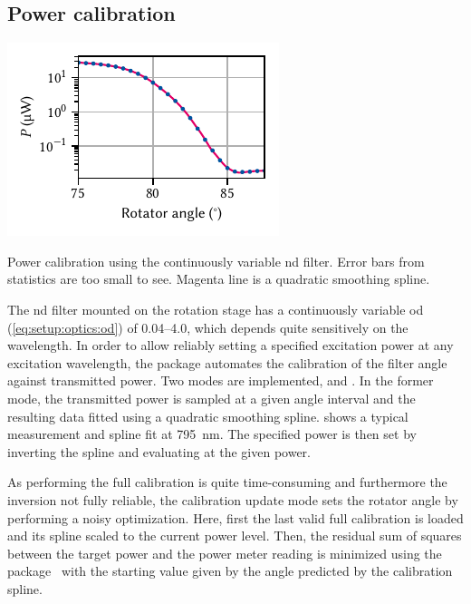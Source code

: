 \subsection{Power calibration}\label{subsec:sec:exp:mjolnir:calibration:power}
\begin{marginfigure}
    \centering
    \includegraphics{img/pdf/experiment/power_calibration}
    \caption[]{
        Power calibration using the continuously variable \acrshort{nd} filter.
        Error bars from statistics are too small to see.
        Magenta line is a quadratic smoothing spline.
    }
    \label{fig:exp:mjolnir:power_calibration}
\end{marginfigure}

The \gls{nd} filter
mounted on the \thorlabsrotator rotation stage has a continuously variable \gls{od} (\cref{eq:setup:optics:od}) of \numrange{0.04}{4.0}, which depends quite sensitively on the wavelength.
In order to allow reliably setting a specified excitation power at any excitation wavelength, the \mjolnir package automates the calibration of the filter angle against transmitted power.
Two modes are implemented,  and .
In the former mode, the transmitted power is sampled at a given angle interval and the resulting data fitted using a quadratic smoothing spline.
 shows a typical measurement and spline fit at \qty{795}{\nano\meter}.
The specified power is then set by inverting the spline and evaluating at the given power.

As performing the full calibration is quite time-consuming and furthermore the inversion not fully reliable, the  calibration update mode sets the rotator angle by performing a noisy optimization.
Here, first the last valid full calibration is loaded and its spline scaled to the current power level.
Then, the residual sum of squares between the target power and the power meter reading is minimized using the  package~\cite{Mayer2016} with the starting value given by the angle predicted by the calibration spline.

